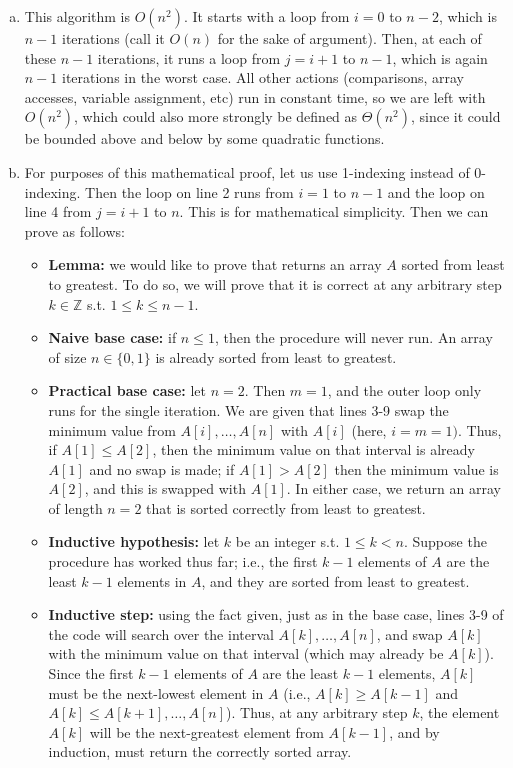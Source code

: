 \documentclass[11pt]{article}
\begin{document}
\begin{enumerate}[(a)]
	\item This algorithm is $O(n^2)$. It starts with a loop from $i = 0$ to $n - 2$, which is $n - 1$ iterations (call it $O(n)$ for the sake of argument). Then, at each of these $n - 1$ iterations, it runs a loop from $j = i + 1$ to $n - 1$, which is again $n - 1$ iterations in the worst case. All other actions (comparisons, array accesses, variable assignment, etc) run in constant time, so we are left with $O(n^2)$, which could also more strongly be defined as $\Theta(n^2)$, since it could be bounded above and below by some quadratic functions.
    \item For purposes of this mathematical proof, let us use 1-indexing instead of 0-indexing. Then the loop on line 2 runs from $i = 1$ to $n - 1$ and the loop on line 4 from $j = i + 1$ to $n$. This is for mathematical simplicity. Then we can prove as follows: \begin{itemize}
        \item \textbf{Lemma:} we would like to prove that  returns an array $A$ sorted from least to greatest. To do so, we will prove that it is correct at any arbitrary step $k \in \mathbb{Z}$ s.t. $1 \leq k \leq n - 1$.
        \item \textbf{Naive base case:} if $n \leq 1$, then the  procedure will never run. An array of size $n \in \{0, 1\}$ is already sorted from least to greatest.
        \item \textbf{Practical base case:} let $n = 2$. Then $m = 1$, and the outer loop only runs for the single iteration. We are given that lines 3-9 swap the minimum value from $A[i], \dots, A[n]$ with $A[i]$ (here, $i = m = 1)$.  Thus, if $A[1] \leq A[2]$, then the minimum value on that interval is already $A[1]$ and no swap is made; if $A[1] > A[2]$ then the minimum value is $A[2]$, and this is swapped with $A[1]$. In either case, we return an array of length $n = 2$ that is sorted correctly from least to greatest.
        \item \textbf{Inductive hypothesis:} let $k$ be an integer s.t. $1 \leq k < n$. Suppose the  procedure has worked thus far; i.e., the first $k - 1$ elements of $A$ are the least $k - 1$ elements in $A$, and they are sorted from least to greatest. 
        \item \textbf{Inductive step:} using the fact given, just as in the base case, lines 3-9 of the code will search over the interval $A[k], \dots, A[n]$, and swap $A[k]$ with the minimum value on that interval (which may already be $A[k]$). Since the first $k - 1$ elements of $A$ are the least $k - 1$ elements, $A[k]$ must be the next-lowest element in $A$ (i.e., $A[k] \geq A[k - 1]$ and $A[k] \leq A[k + 1], \dots, A[n]$). Thus, at any arbitrary step $k$, the element $A[k]$ will be the next-greatest element from $A[k - 1]$, and by induction,  must return the correctly sorted array.
    \end{itemize}
\end{enumerate}
\end{document}
